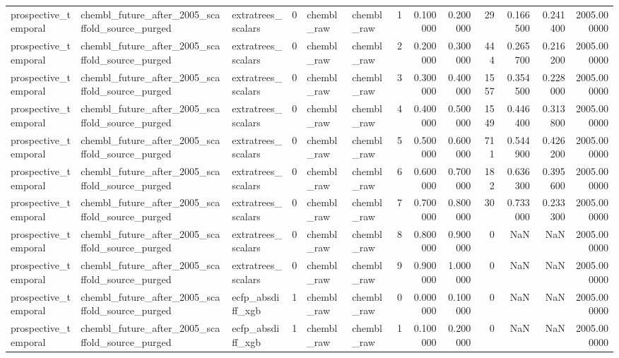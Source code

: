 \begin{longtable}{lllrllrrrrrrr}
prospective\_temporal & chembl\_future\_after\_2005\_scaffold\_source\_purged & extratrees\_scalars & 0 & chembl\_raw & chembl\_raw & 1 & 0.100000 & 0.200000 & 29 & 0.166500 & 0.241400 & 2005.000000 \\
prospective\_temporal & chembl\_future\_after\_2005\_scaffold\_source\_purged & extratrees\_scalars & 0 & chembl\_raw & chembl\_raw & 2 & 0.200000 & 0.300000 & 444 & 0.265700 & 0.216200 & 2005.000000 \\
prospective\_temporal & chembl\_future\_after\_2005\_scaffold\_source\_purged & extratrees\_scalars & 0 & chembl\_raw & chembl\_raw & 3 & 0.300000 & 0.400000 & 1557 & 0.354500 & 0.228000 & 2005.000000 \\
prospective\_temporal & chembl\_future\_after\_2005\_scaffold\_source\_purged & extratrees\_scalars & 0 & chembl\_raw & chembl\_raw & 4 & 0.400000 & 0.500000 & 1549 & 0.446400 & 0.313800 & 2005.000000 \\
prospective\_temporal & chembl\_future\_after\_2005\_scaffold\_source\_purged & extratrees\_scalars & 0 & chembl\_raw & chembl\_raw & 5 & 0.500000 & 0.600000 & 711 & 0.544900 & 0.426200 & 2005.000000 \\
prospective\_temporal & chembl\_future\_after\_2005\_scaffold\_source\_purged & extratrees\_scalars & 0 & chembl\_raw & chembl\_raw & 6 & 0.600000 & 0.700000 & 182 & 0.636300 & 0.395600 & 2005.000000 \\
prospective\_temporal & chembl\_future\_after\_2005\_scaffold\_source\_purged & extratrees\_scalars & 0 & chembl\_raw & chembl\_raw & 7 & 0.700000 & 0.800000 & 30 & 0.733000 & 0.233300 & 2005.000000 \\
prospective\_temporal & chembl\_future\_after\_2005\_scaffold\_source\_purged & extratrees\_scalars & 0 & chembl\_raw & chembl\_raw & 8 & 0.800000 & 0.900000 & 0 & NaN & NaN & 2005.000000 \\
prospective\_temporal & chembl\_future\_after\_2005\_scaffold\_source\_purged & extratrees\_scalars & 0 & chembl\_raw & chembl\_raw & 9 & 0.900000 & 1.000000 & 0 & NaN & NaN & 2005.000000 \\
prospective\_temporal & chembl\_future\_after\_2005\_scaffold\_source\_purged & ecfp\_absdiff\_xgb & 1 & chembl\_raw & chembl\_raw & 0 & 0.000000 & 0.100000 & 0 & NaN & NaN & 2005.000000 \\
prospective\_temporal & chembl\_future\_after\_2005\_scaffold\_source\_purged & ecfp\_absdiff\_xgb & 1 & chembl\_raw & chembl\_raw & 1 & 0.100000 & 0.200000 & 0 & NaN & NaN & 2005.000000 \\

\end{longtable}
